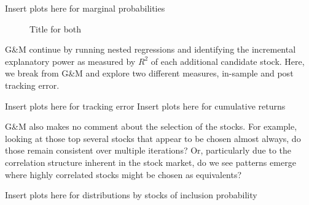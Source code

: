 \documentclass[a4paper, 12pt]{article}
\theoremstyle{plain}
\theoremstyle{definition}
\theoremstyle{remark}
\begin{document}
{\color{red} Insert plots here for marginal probabilities}
\begin{figure}
\hfill
{}
\hfill
{}
\hfill
\caption{Title for both}
\end{figure}



G\&M continue by running nested regressions and identifying the incremental explanatory power as measured by $R^2$ of each additional candidate stock. Here, we break from G\&M and explore two different measures, in-sample and post tracking error.

{\color{red} Insert plots here for tracking error}
{\color{red} Insert plots here for cumulative returns}

G\&M also makes no comment about the selection of the stocks. For example, looking at those top several stocks that appear to be chosen almost always, do those remain consistent over multiple iterations? Or, particularly due to the correlation structure inherent in the stock market, do we see patterns emerge where highly correlated stocks might be chosen as equivalents?

{\color{red} Insert plots here for distributions by stocks of inclusion probability}
\end{document}
